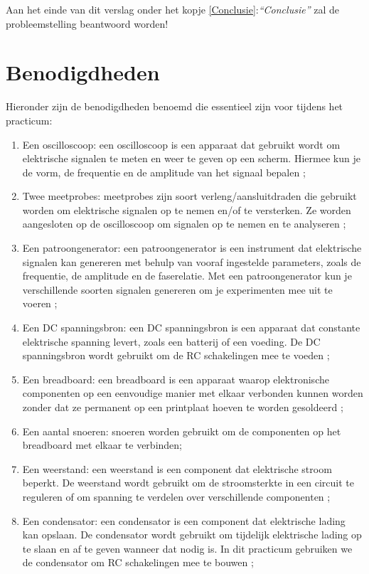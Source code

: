 \documentclass[12pt]{article}
\begin{document}
\vspace{0,5cm}
Aan het einde van dit verslag onder het kopje \ref{Conclusie}:\textit{``Conclusie''} zal de probleemstelling beantwoord worden!
\pagebreak

\section{Benodigdheden}
Hieronder zijn de benodigdheden benoemd die essentieel zijn voor tijdens het practicum:
\begin{enumerate}
    \item Een oscilloscoop: een oscilloscoop is een apparaat dat gebruikt wordt om elektrische signalen te meten en weer te geven op een scherm. Hiermee kun je de vorm, de frequentie en de amplitude van het signaal bepalen \cite{Fluke_oscilloscope};
    \item Twee meetprobes: meetprobes zijn soort verleng/aansluitdraden die gebruikt worden om elektrische signalen op te nemen en/of te versterken. Ze worden aangesloten op de oscilloscoop om signalen op te nemen en te analyseren \cite{Fluke_probes};
    \item Een patroongenerator: een patroongenerator is een instrument dat elektrische signalen kan genereren met behulp van vooraf ingestelde parameters, zoals de frequentie, de amplitude en de faserelatie. Met een patroongenerator kun je verschillende soorten signalen genereren om je experimenten mee uit te voeren \cite{witte2002electronic};
    \item Een DC spanningsbron: een DC spanningsbron is een apparaat dat constante elektrische spanning levert, zoals een batterij of een voeding. De DC spanningsbron wordt gebruikt om de RC schakelingen mee te voeden \cite{Boylestad_1997, patgenwp};
    \item Een breadboard: een breadboard is een apparaat waarop elektronische componenten op een eenvoudige manier met elkaar verbonden kunnen worden zonder dat ze permanent op een printplaat hoeven te worden gesoldeerd \cite{buckley2022whatisabreadboard};
    \item Een aantal snoeren: snoeren worden gebruikt om de componenten op het breadboard met elkaar te verbinden;
    \item Een weerstand: een weerstand is een component dat elektrische stroom beperkt. De weerstand wordt gebruikt om de stroomsterkte in een circuit te reguleren of om spanning te verdelen over verschillende componenten \cite{Schagrin1963};
    \item Een condensator: een condensator is een component dat elektrische lading kan opslaan. De condensator wordt gebruikt om tijdelijk elektrische lading op te slaan en af te geven wanneer dat nodig is. In dit practicum gebruiken we de condensator om RC schakelingen mee te bouwen \cite{bird2010electrical};
\end{enumerate}
\pagebreak
\end{document}

